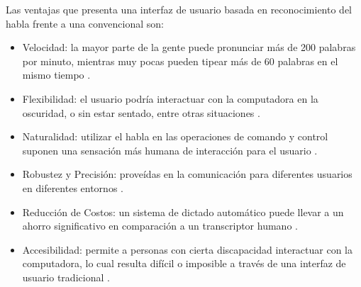 Las ventajas que presenta una interfaz de usuario basada en reconocimiento del habla 
frente a una convencional son:

\begin{itemize}
    \item Velocidad: la mayor parte de la gente puede pronunciar m\'{a}s de 200 palabras por minuto, 
     mientras muy pocas pueden tipear m\'{a}s de 60 palabras en el mismo tiempo \cite{RufinerSistema2004}.

    \item Flexibilidad: el usuario podr\'{i}a interactuar con la computadora en la oscuridad, 
     o sin estar sentado, entre otras situaciones \cite{RufinerSistema2004}.
    
    \item Naturalidad: utilizar el habla en las operaciones de comando y control suponen una 
     sensaci\'{o}n m\'{a}s humana de interacci\'{o}n para el usuario \cite{BellesiReconocimiento2008}. 
    
    \item Robustez y Precisi\'{o}n: prove\'{i}das en la comunicaci\'{o}n para diferentes usuarios 
     en diferentes entornos \cite{BellesiReconocimiento2008}.
    
    \item Reducci\'{o}n de Costos: un sistema de dictado autom\'{a}tico puede llevar a un ahorro 
    significativo en comparaci\'{o}n a un transcriptor humano \cite{GrassoTheLong2003}.
    
    \item Accesibilidad: permite a personas con cierta discapacidad interactuar con la  computadora, 
     lo cual resulta dif\'{i}cil o imposible a trav\'{e}s de una interfaz de usuario tradicional \cite{GarretUsing2011}.
\end{itemize}